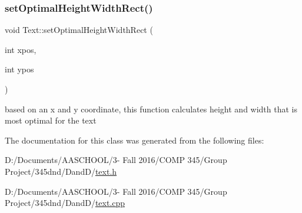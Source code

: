\subsubsection{\texorpdfstring{set\+Optimal\+Height\+Width\+Rect()}{setOptimalHeightWidthRect()}}
{\footnotesize\ttfamily void Text\+::set\+Optimal\+Height\+Width\+Rect (\begin{DoxyParamCaption}\item[{int}]{xpos,  }\item[{int}]{ypos }\end{DoxyParamCaption})}

based on an x and y coordinate, this function calculates height and width that is most optimal for the text 

The documentation for this class was generated from the following files\+:\begin{DoxyCompactItemize}
\item 
D\+:/\+Documents/\+A\+A\+S\+C\+H\+O\+O\+L/3-\/ Fall 2016/\+C\+O\+M\+P 345/\+Group Project/345dnd/\+Dand\+D/\hyperlink{text_8h}{text.\+h}\item 
D\+:/\+Documents/\+A\+A\+S\+C\+H\+O\+O\+L/3-\/ Fall 2016/\+C\+O\+M\+P 345/\+Group Project/345dnd/\+Dand\+D/\hyperlink{text_8cpp}{text.\+cpp}\end{DoxyCompactItemize}
